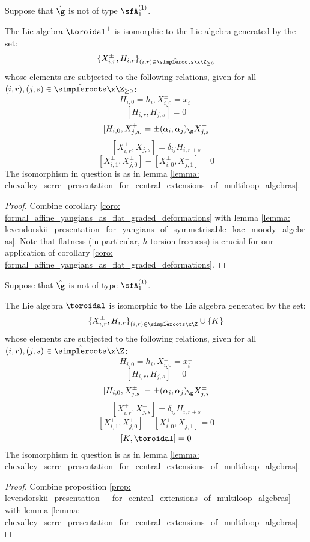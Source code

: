         \begin{proposition} \label{prop: levendorskii_presentation__for_central_extensions_of_multiloop_algebras}
            Suppose that $\hat{\g}$ is not of type $\sfA_1^{(1)}$. 
        
            The Lie algebra $\toroidal^+$ is isomorphic to the Lie algebra  generated by the set:
                $$\{ X_{i, r}^{\pm}, H_{i, r} \}_{(i, r) \in \hat{\simpleroots} \x \Z_{\geq 0}}$$
            whose elements are subjected to the following relations, given for all $(i, r), (j, s) \in \hat{\simpleroots} \x \Z_{\geq 0}$:
                $$H_{i, 0} = h_i, X_{i, 0}^{\pm} = x_i^{\pm}$$
                $$[ H_{i, r}, H_{j, s} ] = 0$$
                $$[ H_{i, 0}, X_{j, s}^{\pm} ] = \pm (\alpha_i, \alpha_j)_{\g} X_{j, s}^{\pm}$$
                $$[ X_{i, r}^+, X_{j, s}^- ] = \delta_{ij} H_{i, r + s}$$
                $$[ X_{i, 1}^{\pm}, X_{j, 0}^{\pm} ] - [ X_{i, 0}^{\pm}, X_{j, 1}^{\pm} ] = 0$$
            The isomorphism in question is as in lemma \ref{lemma: chevalley_serre_presentation_for_central_extensions_of_multiloop_algebras}.
        \end{proposition}
            \begin{proof}
                Combine corollary \ref{coro: formal_affine_yangians_as_flat_graded_deformations} with lemma \ref{lemma: levendorskii_presentation_for_yangians_of_symmetrisable_kac_moody_algebras}. Note that flatness (in particular, $\hbar$-torsion-freeness) is crucial for our application of corollary \ref{coro: formal_affine_yangians_as_flat_graded_deformations}.
            \end{proof}
        \begin{corollary}
            Suppose that $\hat{\g}$ is not of type $\sfA_1^{(1)}$. 
        
            The Lie algebra $\toroidal$ is isomorphic to the Lie algebra  generated by the set:
                $$\{ X_{i, r}^{\pm}, H_{i, r} \}_{(i, r) \in \hat{\simpleroots} \x \Z} \cup \{ K \}$$
            whose elements are subjected to the following relations, given for all $(i, r), (j, s) \in \hat{\simpleroots} \x \Z$:
                $$H_{i, 0} = h_i, X_{i, 0}^{\pm} = x_i^{\pm}$$
                $$[ H_{i, r}, H_{j, s} ] = 0$$
                $$[ H_{i, 0}, X_{j, s}^{\pm} ] = \pm (\alpha_i, \alpha_j)_{\g} X_{j, s}^{\pm}$$
                $$[ X_{i, r}^+, X_{j, s}^- ] = \delta_{ij} H_{i, r + s}$$
                $$[ X_{i, 1}^{\pm}, X_{j, 0}^{\pm} ] - [ X_{i, 0}^{\pm}, X_{j, 1}^{\pm} ] = 0$$
                $$[K, \toroidal] = 0$$
            The isomorphism in question is as in lemma \ref{lemma: chevalley_serre_presentation_for_central_extensions_of_multiloop_algebras}.
        \end{corollary}
            \begin{proof}
                Combine proposition \ref{prop: levendorskii_presentation__for_central_extensions_of_multiloop_algebras} with lemma \ref{lemma: chevalley_serre_presentation_for_central_extensions_of_multiloop_algebras}. 
            \end{proof}

